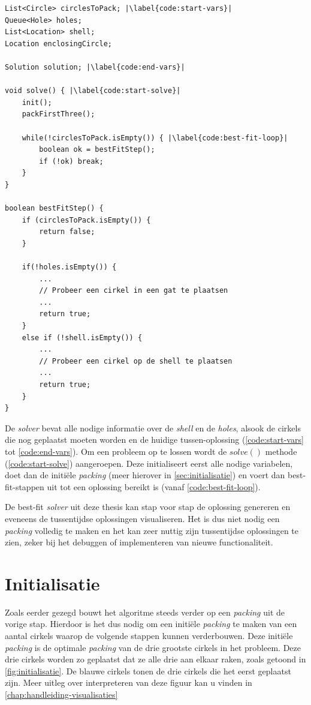 \documentclass[12pt,a4paper,oneside]{book}
\begin{document}
\begin{lstlisting}
List<Circle> circlesToPack; |\label{code:start-vars}|
Queue<Hole> holes;
List<Location> shell;
Location enclosingCircle;

Solution solution; |\label{code:end-vars}|

void solve() { |\label{code:start-solve}|
	init();
	packFirstThree();
	
	while(!circlesToPack.isEmpty()) { |\label{code:best-fit-loop}|
		boolean ok = bestFitStep();
		if (!ok) break;
	}
}

boolean bestFitStep() {
	if (circlesToPack.isEmpty()) {
		return false;
	}
	
	if(!holes.isEmpty()) {
		...
		// Probeer een cirkel in een gat te plaatsen
		...
		return true;
	}
	else if (!shell.isEmpty()) {
		...
		// Probeer een cirkel op de shell te plaatsen
		...
		return true;
	}
}
\end{lstlisting}

De \textit{solver} bevat alle nodige informatie over de \textit{shell} en de \textit{holes}, alsook de cirkels die nog geplaatst moeten worden en de huidige tussen-oplossing (\autoref{code:start-vars} tot \autoref{code:end-vars}).
Om een probleem op te lossen wordt de $solve()$ methode (\autoref{code:start-solve}) aangeroepen.
Deze initialiseert eerst alle nodige variabelen, doet dan de initiële \textit{packing} (meer hierover in \autoref{sec:initialisatie}) en voert dan best-fit-stappen uit tot een oplossing bereikt is (vanaf \autoref{code:best-fit-loop}).

De best-fit \textit{solver} uit deze thesis kan stap voor stap de oplossing genereren en eveneens de tussentijdse oplossingen visualiseren.
Het is dus niet nodig een \textit{packing} volledig te maken en het kan zeer nuttig zijn tussentijdse oplossingen te zien, zeker bij het debuggen of implementeren van nieuwe functionaliteit.

\section{Initialisatie} \label{sec:initialisatie}

Zoals eerder gezegd bouwt het algoritme steeds verder op een \textit{packing} uit de vorige stap.
Hierdoor is het dus nodig om een initiële \textit{packing} te maken van een aantal cirkels waarop de volgende stappen kunnen verderbouwen.
Deze initiële \textit{packing} is de optimale \textit{packing} van de drie grootste cirkels in het probleem.
Deze drie cirkels worden zo geplaatst dat ze alle drie aan elkaar raken, zoals getoond in \autoref{fig:initialisatie}.
De blauwe cirkels tonen de drie cirkels die het eerst geplaatst zijn.
Meer uitleg over interpreteren van deze figuur kan u vinden in \autoref{chap:handleiding-visualisaties}
\end{document}
